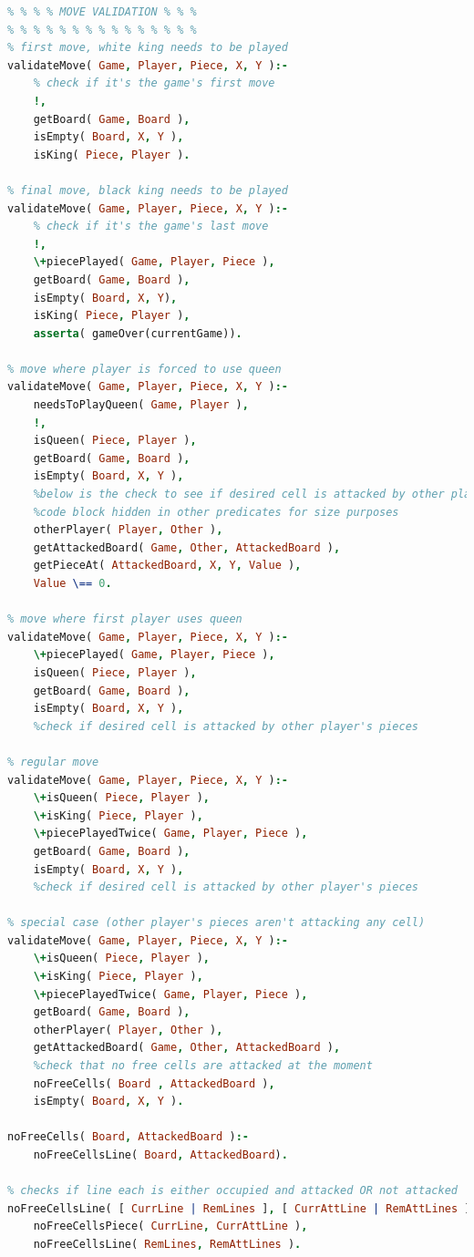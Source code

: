 \documentclass[a4paper]{article}
\begin{document}
\begin{small}
\begin{lstlisting}[language=Prolog]
% % % % % % % % % % % % % % %
% % % % MOVE VALIDATION % % %
% % % % % % % % % % % % % % %
% first move, white king needs to be played
validateMove( Game, Player, Piece, X, Y ):-
	% check if it's the game's first move
	!,
	getBoard( Game, Board ),
	isEmpty( Board, X, Y ),
	isKing( Piece, Player ).

% final move, black king needs to be played
validateMove( Game, Player, Piece, X, Y ):-
	% check if it's the game's last move
	!,
	\+piecePlayed( Game, Player, Piece ),
	getBoard( Game, Board ),
	isEmpty( Board, X, Y),
	isKing( Piece, Player ),
	asserta( gameOver(currentGame)).

% move where player is forced to use queen
validateMove( Game, Player, Piece, X, Y ):-
	needsToPlayQueen( Game, Player ),
	!,
	isQueen( Piece, Player ),
	getBoard( Game, Board ),
	isEmpty( Board, X, Y ),
    %below is the check to see if desired cell is attacked by other player's pieces
    %code block hidden in other predicates for size purposes
	otherPlayer( Player, Other ),
	getAttackedBoard( Game, Other, AttackedBoard ),
	getPieceAt( AttackedBoard, X, Y, Value ),
	Value \== 0.

% move where first player uses queen
validateMove( Game, Player, Piece, X, Y ):-
	\+piecePlayed( Game, Player, Piece ),
	isQueen( Piece, Player ),
	getBoard( Game, Board ),
	isEmpty( Board, X, Y ),
	%check if desired cell is attacked by other player's pieces

% regular move
validateMove( Game, Player, Piece, X, Y ):-
	\+isQueen( Piece, Player ),
	\+isKing( Piece, Player ),
	\+piecePlayedTwice( Game, Player, Piece ),
	getBoard( Game, Board ),
	isEmpty( Board, X, Y ),
	%check if desired cell is attacked by other player's pieces

% special case (other player's pieces aren't attacking any cell)
validateMove( Game, Player, Piece, X, Y ):-
	\+isQueen( Piece, Player ),
	\+isKing( Piece, Player ),
	\+piecePlayedTwice( Game, Player, Piece ),
	getBoard( Game, Board ),
	otherPlayer( Player, Other ),
	getAttackedBoard( Game, Other, AttackedBoard ),
    %check that no free cells are attacked at the moment
	noFreeCells( Board , AttackedBoard ),
	isEmpty( Board, X, Y ).

noFreeCells( Board, AttackedBoard ):-
	noFreeCellsLine( Board, AttackedBoard).

% checks if line each is either occupied and attacked OR not attacked
noFreeCellsLine( [ CurrLine | RemLines ], [ CurrAttLine | RemAttLines ]):-
	noFreeCellsPiece( CurrLine, CurrAttLine ),
	noFreeCellsLine( RemLines, RemAttLines ).


\end{lstlisting}
\end{small}
\end{document}
